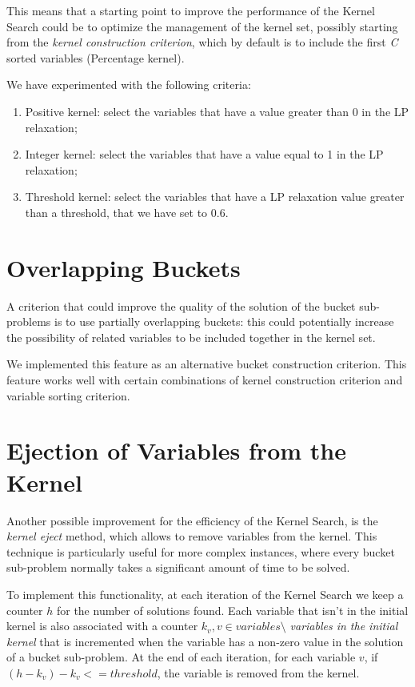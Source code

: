 This means that a starting point to improve the performance of the Kernel Search
could be to optimize the management of the kernel set,
possibly starting from the \textit{kernel construction criterion},
which by default is to include the first \textit{C} sorted variables
(Percentage kernel).

We have experimented with the following criteria:
\begin{enumerate}
    \item Positive kernel: select the variables that have a value greater than 0 in the LP relaxation;
    \item Integer kernel: select the variables that have a value equal to 1 in the LP relaxation;
    \item Threshold kernel: select the variables that have a LP relaxation value greater than a threshold,
    that we have set to 0.6.
\end{enumerate}


\section{Overlapping Buckets}
A criterion that could improve the quality of the solution of the bucket
sub-problems is to use partially overlapping buckets:
this could potentially increase the possibility of related
variables to be included together in the kernel set.

We implemented this feature as an alternative bucket construction criterion.
This feature works well with certain combinations of
kernel construction criterion and variable sorting criterion.


\section{Ejection of Variables from the Kernel}
Another possible improvement for the efficiency of the Kernel Search,
is the \textit{kernel eject} method, which allows to remove variables from the kernel.
This technique is particularly useful for more complex instances, where every
bucket sub-problem normally takes a significant amount of time to be solved.

To implement this functionality, at each iteration of the Kernel Search
we keep a counter \(h\) for the number of solutions found.
Each variable that isn't in the initial kernel
is also associated with a counter \(k_{v}, v \in variables \setminus\) \textit{variables in the initial kernel}
that is incremented when the variable has a non-zero value in the solution of a bucket sub-problem.
At the end of each iteration, for each variable \(v\), if
\((h - k_{v}) - k_{v} <= threshold\), the variable is removed from the kernel.

